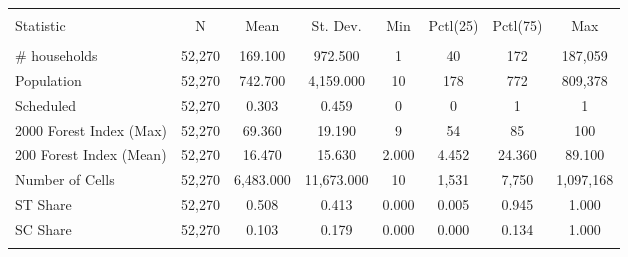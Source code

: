 
\begin{tabular}{@{\extracolsep{5pt}}lccccccc} 
\\[-1.8ex]\hline 
\hline \\[-1.8ex] 
Statistic & \multicolumn{1}{c}{N} & \multicolumn{1}{c}{Mean} & \multicolumn{1}{c}{St. Dev.} & \multicolumn{1}{c}{Min} & \multicolumn{1}{c}{Pctl(25)} & \multicolumn{1}{c}{Pctl(75)} & \multicolumn{1}{c}{Max} \\ 
\hline \\[-1.8ex] 
\# households & 52,270 & 169.100 & 972.500 & 1 & 40 & 172 & 187,059 \\ 
Population & 52,270 & 742.700 & 4,159.000 & 10 & 178 & 772 & 809,378 \\ 
Scheduled & 52,270 & 0.303 & 0.459 & 0 & 0 & 1 & 1 \\ 
2000 Forest Index (Max) & 52,270 & 69.360 & 19.190 & 9 & 54 & 85 & 100 \\ 
200 Forest Index (Mean) & 52,270 & 16.470 & 15.630 & 2.000 & 4.452 & 24.360 & 89.100 \\ 
Number of Cells & 52,270 & 6,483.000 & 11,673.000 & 10 & 1,531 & 7,750 & 1,097,168 \\ 
ST Share & 52,270 & 0.508 & 0.413 & 0.000 & 0.005 & 0.945 & 1.000 \\ 
SC Share & 52,270 & 0.103 & 0.179 & 0.000 & 0.000 & 0.134 & 1.000 \\ 
\hline \\[-1.8ex] 
\end{tabular} 
